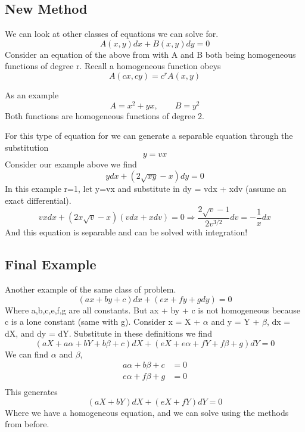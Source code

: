 \documentclass{article}
\newcommand{\be}{\begin{equation}}
\newcommand{\ee}{\end{equation}}
\begin{document}
\subsection*{New Method}
We can look at other classes of equations we can solve for.
\be
A(x,y)dx + B(x,y)dy = 0
\ee
Consider an equation of the above from with A and B both being homogeneous functions of degree r.
Recall a homogeneous function obeys
\be
A(cx,cy) = c^r A(x,y)
\ee

As an example
\be
A = x^2 + yx, \qquad B = y^2
\ee
Both functions are homogeneous functions of degree 2.

For this type of equation for we can generate a separable equation through the substitution
\be
y = vx
\ee
Consider our example above we find
\be
ydx + (2\sqrt{xy} - x) dy = 0
\ee
In this example r=1, let y=vx and substitute in dy = vdx + xdv (assume an exact differential).
\be
vxdx + (2x\sqrt{v} - x) (vdx + xdv) = 0 \Rightarrow \frac{2\sqrt{v}-1}{2v^{3/2}}dv = -\frac{1}{x} dx
\ee
And this equation is separable and can be solved with integration!

\subsection*{Final Example}
Another example of the same class of problem.
\be
(ax + by + c) dx + (ex + fy + g dy) = 0
\ee
Where a,b,c,e,f,g are all constants.
But ax + by + c is not homogeneous because c is a lone constant (same with g).
Consider x = X + $\alpha$ and y = Y + $\beta$, dx = dX, and dy = dY.
Substitute in these definitions we find
\be
(aX + a\alpha + bY + b\beta + c) dX + (eX + e\alpha + fY + f\beta + g) dY = 0
\ee
We can find $\alpha$ and $\beta$,
\be
\begin{split}
    a\alpha + b\beta + c &= 0 \\
    e\alpha + f\beta + g &= 0 \\
\end{split}
\ee
This generates
\be
(aX + bY)dX + (eX + fY)dY = 0
\ee
Where we have a homogeneous equation, and we can solve using the methods from before.
\end{document}
